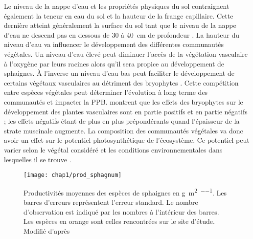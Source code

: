 Le niveau de la nappe d'eau et les propriétés physiques du sol contraignent également la teneur en eau du sol et la hauteur de la frange capillaire.
Cette dernière atteint généralement la surface du sol tant que le niveau de la nappe d'eau ne descend pas en dessous de \num{30} à \SI{40}{\centi\metre} de profondeur \citep{laiho2006}.
La hauteur du niveau d'eau va influencer le développement des différentes communautés végétales.
Un niveau d'eau élevé peut diminuer l'accès de la végétation vasculaire à l'oxygène par leurs racines alors qu'il sera propice au développement de sphaignes.
À l'inverse un niveau d'eau bas peut faciliter le développement de certains végétaux vasculaires au détriment des bryophytes \plop.
Cette compétition entre espèces végétales peut déterminer l'évolution à long terme des communautés et impacter la PPB.
\citet{gornall2011} montrent que les effets des bryophytes sur le développement des plantes vasculaires sont en partie positifs et en partie négatifs ; les effets négatifs étant de plus en plus prépondérants quand l'épaisseur de la strate muscinale augmente.
La composition des communautés végétales va donc avoir un effet sur le potentiel photosynthétique de l'écosystème.
Ce potentiel peut varier selon le végétal considéré et les conditions environnementales dans lesquelles il se trouve \citep{moore2002}.

\begin{figure}
\centering
\texttt{[image: chap1/prod\_sphagnum]}
\caption{Productivités moyennes des espèces de sphaignes en \si{\gram\per\square\metre\per\year}. Les barres d'erreurs représentent l'erreur standard. Le nombre d'observation est indiqué par les nombres à l'intérieur des barres. Les espèces en orange sont celles rencontrées sur le site d'étude. Modifié d'après \citet{gunnarsson2005}}
\label{fig:prod_sphagnum}
\end{figure}

